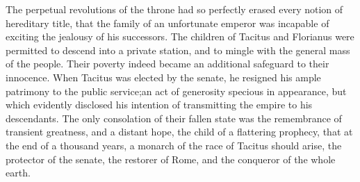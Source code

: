 
The perpetual revolutions of the throne had so perfectly erased
every notion of hereditary title, that the family of an
unfortunate emperor was incapable of exciting the jealousy of his
successors. The children of Tacitus and Florianus were permitted
to descend into a private station, and to mingle with the general
mass of the people. Their poverty indeed became an additional
safeguard to their innocence. When Tacitus was elected by the
senate, he resigned his ample patrimony to the public service;\footnotemark[21]
an act of generosity specious in appearance, but which evidently
disclosed his intention of transmitting the empire to his
descendants. The only consolation of their fallen state was the
remembrance of transient greatness, and a distant hope, the child
of a flattering prophecy, that at the end of a thousand years, a
monarch of the race of Tacitus should arise, the protector of the
senate, the restorer of Rome, and the conqueror of the whole
earth.\footnotemark[22]



